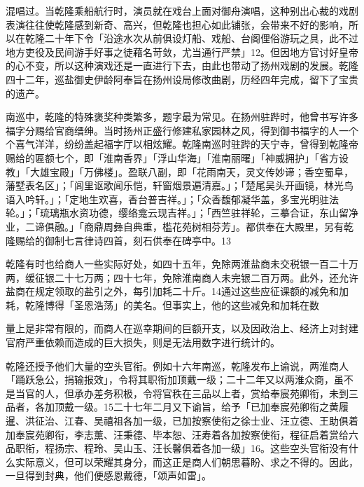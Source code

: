 \noindent 混唱过。当乾隆乘船航行时，演员就在戏台上面对御舟演唱，这种别出心裁的戏剧表演往往使乾隆感到新奇、高兴，但乾隆也担心如此铺张，会带来不好的影响，所以在乾隆二十年下令「沿途水次从前俱设灯船、戏船、台阁俚俗游玩之具，此不过地方吏役及民间游手好事之徒藉名苛敛，尤当通行严禁」12。但因地方官讨好皇帝的心不变，所以这种演戏还是一直进行下去，由此也带动了扬州戏剧的发展。乾隆四十二年，巡盐御史伊龄阿奉旨在扬州设局修改曲剧，历经四年完成，留下了宝贵的遗产。


南巡中，乾隆的特殊褒奖种类繁多，题字最为常见。在扬州驻跸时，他曾书写许多福字分赐给官商缙绅。当时扬州正盛行修建私家园林之风，得到御书福字的人一个个喜气洋洋，纷纷盖起福字厅以相炫耀。乾隆南巡时驻跸的天宁寺，曾得到乾隆帝赐给的匾额七个，即「淮南香界」「浮山华海」「淮南丽曙」「神威拥护」「省方设教」「大雄宝殿」「万佛楼」。盈联八副，即「花雨南天，灵文传妙谛；香空蜀阜，藩墅表名区」；「闾里讴歌闻乐恺，轩窗烟景遍清嘉。」；「楚尾吴头开画镜，林光鸟语入吟轩。」；「定地生欢喜，香台普吉祥。」；「众香馥郁凝华盖，多宝光明驻法轮。」；「琉璃瓶水资功德，缨络龛云现吉祥。」；「西竺驻祥轮，三摹合证，东山留净业，二谛俱融。」「商鼎周彝自典重，槛花苑树相芬芳」。都供奉在大殿里，另有乾隆赐给的御制七言律诗四首，刻石供奉在碑亭中。13

乾隆有时也给商人一些实际好处，如四十五年，免除两淮盐商未交税银一百二十万两，缓征银二十七万两；四十七年，免除淮南商人未完银二百万两。此外，还允许盐商在规定领取的盐引之外，每引加耗二十斤。14通过这些应征课额的减免和加耗，乾隆博得「圣恩浩荡」的美名。但事实上，他的这些减免和加耗在数

\vfill
\begin{BookNotes}
\end{BookNotes}

\noindent 量上是非常有限的，而商人在巡幸期间的巨额开支，以及因政治上、经济上对封建官府严重依赖而造成的巨大损失，则是无法用数字进行统计的。

乾隆还授予他们大量的空头官衔。例如十六年南巡，乾隆发布上谕说，两淮商人「踊跃急公，捐输报效」，令将其职衔加顶戴一级；二十二年又以两淮众商，虽不是当官的人，但承办差务积极，令将官秩在三品以上者，赏给奉宸苑卿衔，未到三品者，各加顶戴一级。15二十七年二月又下谕旨，给予「已加奉宸苑卿衔之黄履暹、洪征治、江春、吴禧祖各加一级，已加按察使衔之徐士业、汪立德、王助俱着加奉宸苑卿衔，李志薰、汪秉德、毕本恕、汪寿着各加按察使衔，程征启着赏给六品职衔，程扬宗、程玲、吴山玉、汪长馨俱着各加一级」16。这些空头官衔没有什么实际意义，但可以荣耀其身分，而这正是商人们朝思暮盼、求之不得的。因此，一旦得到封典，他们便感恩戴德，「颂声如雷」。

